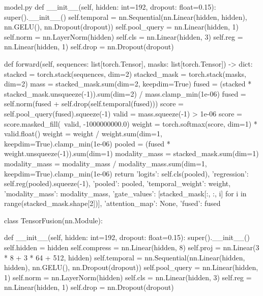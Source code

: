 \documentclass[bwprint]{gmcmthesis}
\begin{document}
\begin{appendices}
\begin{Python}{model.py}
    def __init__(self, hidden: int=192, dropout: float=0.15):
        super().__init__()
        self.temporal = nn.Sequential(nn.Linear(hidden, hidden), nn.GELU(), nn.Dropout(dropout))
        self.pool_query = nn.Linear(hidden, 1)
        self.norm = nn.LayerNorm(hidden)
        self.cls = nn.Linear(hidden, 3)
        self.reg = nn.Linear(hidden, 1)
        self.drop = nn.Dropout(dropout)

    def forward(self, sequences: list[torch.Tensor], masks: list[torch.Tensor]) -> dict:
        stacked = torch.stack(sequences, dim=2)
        stacked_mask = torch.stack(masks, dim=2)
        mass = stacked_mask.sum(dim=2, keepdim=True)
        fused = (stacked * stacked_mask.unsqueeze(-1)).sum(dim=2) / mass.clamp_min(1e-06)
        fused = self.norm(fused + self.drop(self.temporal(fused)))
        score = self.pool_query(fused).squeeze(-1)
        valid = mass.squeeze(-1) > 1e-06
        score = score.masked_fill(~valid, -1000000000.0)
        weight = torch.softmax(score, dim=1) * valid.float()
        weight = weight / weight.sum(dim=1, keepdim=True).clamp_min(1e-06)
        pooled = (fused * weight.unsqueeze(-1)).sum(dim=1)
        modality_mass = stacked_mask.sum(dim=1)
        modality_mass = modality_mass / modality_mass.sum(dim=1, keepdim=True).clamp_min(1e-06)
        return {'logits': self.cls(pooled), 'regression': self.reg(pooled).squeeze(-1), 'pooled': pooled, 'temporal_weight': weight, 'modality_mass': modality_mass, 'gate_values': [stacked_mask[:, :, i] for i in range(stacked_mask.shape[2])], 'attention_map': None, 'fused': fused}

class TensorFusion(nn.Module):

    def __init__(self, hidden: int=192, dropout: float=0.15):
        super().__init__()
        self.hidden = hidden
        self.compress = nn.Linear(hidden, 8)
        self.proj = nn.Linear(3 * 8 + 3 * 64 + 512, hidden)
        self.temporal = nn.Sequential(nn.Linear(hidden, hidden), nn.GELU(), nn.Dropout(dropout))
        self.pool_query = nn.Linear(hidden, 1)
        self.norm = nn.LayerNorm(hidden)
        self.cls = nn.Linear(hidden, 3)
        self.reg = nn.Linear(hidden, 1)
        self.drop = nn.Dropout(dropout)


\end{Python}
\end{appendices}
\end{document}

